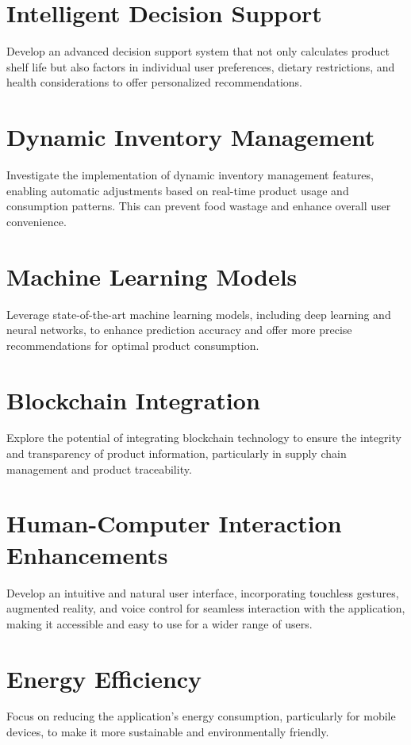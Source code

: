 \section{Intelligent Decision Support}
Develop an advanced decision support system that not only calculates product shelf life but also factors in individual user preferences, dietary restrictions, and health considerations to offer personalized recommendations.

\section{Dynamic Inventory Management}
Investigate the implementation of dynamic inventory management features, enabling automatic adjustments based on real-time product usage and consumption patterns. This can prevent food wastage and enhance overall user convenience.

\section{Machine Learning Models}
Leverage state-of-the-art machine learning models, including deep learning and neural networks, to enhance prediction accuracy and offer more precise recommendations for optimal product consumption.

\section{Blockchain Integration}
Explore the potential of integrating blockchain technology to ensure the integrity and transparency of product information, particularly in supply chain management and product traceability.

\section{Human-Computer Interaction Enhancements}
Develop an intuitive and natural user interface, incorporating touchless gestures, augmented reality, and voice control for seamless interaction with the application, making it accessible and easy to use for a wider range of users.

\section{Energy Efficiency}
Focus on reducing the application's energy consumption, particularly for mobile devices, to make it more sustainable and environmentally friendly.

